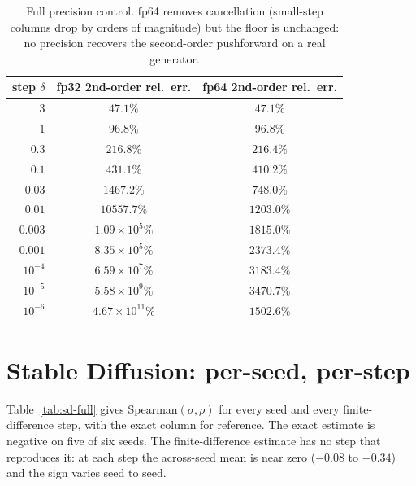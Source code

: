 \documentclass[10pt]{article} %
\begin{document}
\begin{table}[h]\centering\small
\begin{tabular}{rcc}
\toprule
step $\delta$ & fp32 2nd-order rel.\ err. & fp64 2nd-order rel.\ err. \\
\midrule
$3$ & $47.1\%$ & $47.1\%$ \\
$1$ & $96.8\%$ & $96.8\%$ \\
$0.3$ & $216.8\%$ & $216.4\%$ \\
$0.1$ & $431.1\%$ & $410.2\%$ \\
$0.03$ & $1467.2\%$ & $748.0\%$ \\
$0.01$ & $10557.7\%$ & $1203.0\%$ \\
$0.003$ & $1.09\times10^{5}\%$ & $1815.0\%$ \\
$0.001$ & $8.35\times10^{5}\%$ & $2373.4\%$ \\
$10^{-4}$ & $6.59\times10^{7}\%$ & $3183.4\%$ \\
$10^{-5}$ & $5.58\times10^{9}\%$ & $3470.7\%$ \\
$10^{-6}$ & $4.67\times10^{11}\%$ & $1502.6\%$ \\
\bottomrule
\end{tabular}
\caption{Full precision control. fp64 removes cancellation (small-step columns drop
by orders of magnitude) but the floor is unchanged: no precision recovers the
second-order pushforward on a real generator.}
\label{tab:fp64-full}
\end{table}

\section{Stable Diffusion: per-seed, per-step}
\label{app:sdfull}
Table~\ref{tab:sd-full} gives Spearman$(\sigma,\rho)$ for every seed and every
finite-difference step, with the exact column for reference. The exact estimate is
negative on five of six seeds. The finite-difference estimate has no step that
reproduces it: at each step the across-seed mean is near zero ($-0.08$ to $-0.34$)
and the sign varies seed to seed.
\end{document}
